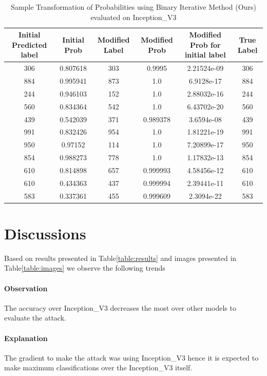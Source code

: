 \documentclass[letterpaper]{article} %
\begin{document}
\begin{table}
\begin{center}
    

\begin{tabular}{|c|c|c|c|c|c|}
\hline
    Initial Predicted label & Initial Prob & Modified Label & Modified Prob & Modified Prob for initial label & True Label \\
\hline
    306 & 0.807618 & 303 & 0.9995 & 2.21524e-09 & 306 \\
\hline
    884 & 0.995941 & 873 & 1.0 & 6.9128e-17 & 884 \\
\hline
    244 & 0.946103 & 152 & 1.0 & 2.88032e-16 & 244 \\
\hline
    560 & 0.834364 & 542 & 1.0 & 6.43702e-20 & 560 \\
\hline
    439 & 0.542039 & 371 & 0.989378 & 3.6594e-08 & 439 \\
\hline
    991 & 0.832426 & 954 & 1.0 & 1.81221e-19 & 991 \\
\hline
    950 & 0.97152 & 114 & 1.0 & 7.20899e-17 & 950 \\
\hline
    854 & 0.988273 & 778 & 1.0 & 1.17832e-13 & 854 \\
\hline
    610 & 0.814898 & 657 & 0.999993 & 4.58456e-12 & 610 \\
\hline
    610 & 0.434363 & 437 & 0.999994 & 2.39441e-11 & 610 \\
\hline
    583 & 0.337361 & 455 & 0.999609 & 2.3094e-22 & 583 \\
\hline
\end{tabular}
\caption{Sample Transformation of Probabilities using Binary Iterative Method (Ours) evaluated on Inception\_V3}
\label{table:trans}
\end{center}
\end{table}

\section{Discussions}

Based on results presented in Table\ref{table:results} and images presented in Table\ref{table:images} we observe the following trends

\paragraph{Observation} The accuracy over Inception\_V3 decreases the most over other models to evaluate the attack.
\paragraph{Explanation} The gradient to make the attack was using Inception\_V3 hence it is expected to make maximum classifications over the Inception\_V3 itself.
\end{document}
